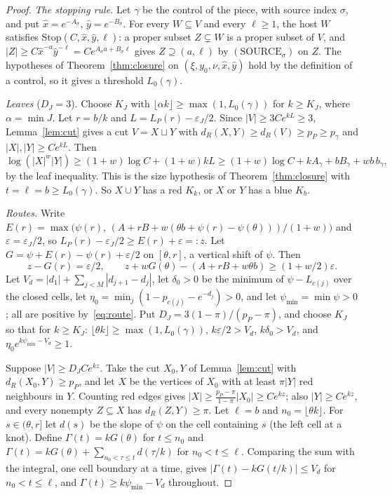 \documentclass[11pt]{article}
\theoremstyle{definition}
\theoremstyle{remark}
\begin{document}
\begin{proof}
\emph{The stopping rule.} Let $\gamma$ be the control of the piece, with source index $\sigma$, and put
$\hat x=e^{-A_\sigma}$, $\hat y=e^{-B_\sigma}$. For every $W\subseteq V$ and every $\ell\ge1$, the host $W$ satisfies
$\mathrm{Stop}(C,\hat x,\hat y,\ell)$: a proper subset $Z\subsetneq W$ is a proper subset of $V$, and
$|Z|\ge C\hat x^{-a}\hat y^{-\ell}=Ce^{A_\sigma a+B_\sigma\ell}$ gives $Z\supseteq(a,\ell)$ by
$(\mathrm{SOURCE}_\sigma)$ on $Z$. The hypotheses of Theorem~\ref{thm:closure} on $(\xi,y_0,\nu,\hat x,\hat y)$ hold
by the definition of a control, so it gives a threshold $L_0(\gamma)$.

\emph{Leaves} ($D_J=3$). Choose $K_J$ with $\lfloor\alpha k\rfloor\ge\max(1,L_0(\gamma))$ for $k\ge K_J$, where
$\alpha=\min J$. Let $r=b/k$ and $L=L_P(r)-\varepsilon_J/2$. Since $|V|\ge3Ce^{kL}\ge3$, Lemma~\ref{lem:cut} gives a cut
$V=X\sqcup Y$ with $d_R(X,Y)\ge d_R(V)\ge p_P\ge p_\gamma$ and $|X|,|Y|\ge Ce^{kL}$. Then
\[
\log(|X|^w|Y|)\ge(1+w)\log C+(1+w)kL\ge(1+w)\log C+kA_\gamma+bB_\gamma+wb\,b_\gamma,
\]
by the leaf inequality. This is the size hypothesis of Theorem~\ref{thm:closure} with $t=\ell=b\ge L_0(\gamma)$. So
$X\cup Y$ has a red $K_k$, or $X$ or $Y$ has a blue $K_b$.

\emph{Routes.} Write $E(r)=\max\big(\psi(r),\,(A+rB+w(\theta b+\psi(r)-\psi(\theta)))/(1+w)\big)$ and
$\varepsilon=\varepsilon_J/2$, so $L_P(r)-\varepsilon_J/2\ge E(r)+\varepsilon=:z$. Let
$G=\psi+E(r)-\psi(r)+\varepsilon/2$ on $[\theta,r]$, a vertical shift of $\psi$. Then
\[
z-G(r)=\varepsilon/2,\qquad z+wG(\theta)-(A+rB+w\theta b)\ge(1+w/2)\varepsilon.
\]
Let $V_d=|d_1|+\sum_{j<M}|d_{j+1}-d_j|$, let $\delta_0>0$ be the minimum of $\psi-L_{c(j)}$ over the closed cells, let
$\eta_0=\min_j(1-p_{c(j)}-e^{-d_j})>0$, and let $\psi_{\min}=\min\psi>0$; all are positive by~\eqref{eq:route}. Put
$D_J=3(1-\pi)/(p_P-\pi)$, and choose $K_J$ so that for $k\ge K_J$: $\lfloor\theta k\rfloor\ge\max(1,L_0(\gamma))$,
$k\varepsilon/2>V_d$, $k\delta_0>V_d$, and $\eta_0e^{k\psi_{\min}-V_d}\ge1$.

Suppose $|V|\ge D_JCe^{kz}$. Take the cut $X_0,Y$ of Lemma~\ref{lem:cut} with $d_R(X_0,Y)\ge p_P$, and let $X$ be the
vertices of $X_0$ with at least $\pi|Y|$ red neighbours in $Y$. Counting red edges gives
$|X|\ge\frac{p_P-\pi}{1-\pi}|X_0|\ge Ce^{kz}$; also $|Y|\ge Ce^{kz}$, and every nonempty $Z\subseteq X$ has
$d_R(Z,Y)\ge\pi$. Let $\ell=b$ and $n_0=\lfloor\theta k\rfloor$. For $s\in(\theta,r]$ let $d(s)$ be the slope of $\psi$ on
the cell containing $s$ (the left cell at a knot). Define $\Gamma(t)=kG(\theta)$ for $t\le n_0$ and
$\Gamma(t)=kG(\theta)+\sum_{n_0<\tau\le t}d(\tau/k)$ for $n_0<t\le\ell$. Comparing the sum with the integral, one cell
boundary at a time, gives $|\Gamma(t)-kG(t/k)|\le V_d$ for $n_0<t\le\ell$, and $\Gamma(t)\ge k\psi_{\min}-V_d$
throughout.


\end{proof}
\end{document}
